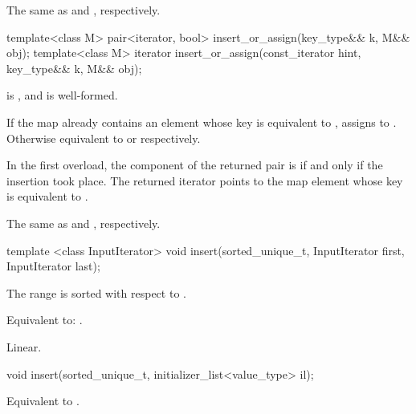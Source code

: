 \begin{codeblock}
\begin{codeblock}
\begin{codeblock}
\begin{addedblock}
\begin{itemdescr}
\pnum
\complexity
The same as  and ,
respectively.
\end{itemdescr}

%
\begin{itemdecl}
template<class M>
  pair<iterator, bool> insert_or_assign(key_type&& k, M&& obj);
template<class M>
  iterator insert_or_assign(const_iterator hint, key_type&& k, M&& obj);
\end{itemdecl}

\begin{itemdescr}
\pnum
\constraints
{} is , and
 is well-formed.

\pnum
\effects
If the map already contains an element 
whose key is equivalent to ,
assigns  to .
Otherwise equivalent to  or
 respectively.

\pnum
\returns
In the first overload,
the  component of the returned pair is 
if and only if the insertion took place.
The returned iterator points to the map element
whose key is equivalent to .

\pnum
\complexity
The same as  and ,
respectively.
\end{itemdescr}

%
\begin{itemdecl}
template <class InputIterator>
  void insert(sorted_unique_t, InputIterator first, InputIterator last);
\end{itemdecl}

\begin{itemdescr}
\pnum \expects
The range  is sorted with respect to .

\pnum \effects Equivalent to: .

\pnum \complexity Linear.
\end{itemdescr}

%
\begin{itemdecl}
void insert(sorted_unique_t, initializer_list<value_type> il);
\end{itemdecl}

\begin{itemdescr}
\pnum \effects Equivalent to .
\end{itemdescr}


\end{addedblock}
\end{codeblock}
\end{codeblock}
\end{codeblock}
